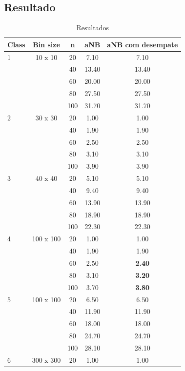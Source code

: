 \documentclass[article]{rian_article}
\begin{document}
\subsection{Resultado}
\begin{longtable}{|l|c|c|c|c|}
	\caption{Resultados}
	\label{tab:result} \\
	\hline
	\multicolumn{1}{|c|}{\textbf{Class}} & \multicolumn{1}{c|}{\textbf{Bin size}} & \multicolumn{1}{c|}{\textbf{n}} & \multicolumn{1}{c|}{\textbf{aNB \citep{resende2013}}} &  \multicolumn{1}{c|}{\textbf{aNB com desempate}}\\ \hline 
	\endfirsthead
	1 & 10 x 10 & 20 & 7.10 & 7.10 \\ \hline
	&  & 40 & 13.40 & 13.40 \\ \hline
	&  & 60 & 20.00 & 20.00 \\ \hline
	&  & 80 & 27.50 & 27.50 \\ \hline
	&  & 100 & 31.70 & 31.70 \\ \hline
	2 & 30 x 30 & 20 & 1.00 & 1.00 \\ \hline
	&  & 40 & 1.90 & 1.90 \\ \hline
	&  & 60 & 2.50 & 2.50 \\ \hline
	&  & 80 & 3.10 & 3.10 \\ \hline
	&  & 100 & 3.90 & 3.90 \\ \hline
	3 & 40 x 40 & 20 & 5.10 & 5.10 \\ \hline
	&  & 40 & 9.40 & 9.40 \\ \hline
	&  & 60 & 13.90 & 13.90 \\ \hline
	&  & 80 & 18.90 & 18.90 \\ \hline
	&  & 100 & 22.30 & 22.30 \\ \hline
	4 & 100 x 100 & 20 & 1.00 & 1.00 \\ \hline
	&  & 40 & 1.90 & 1.90 \\ \hline
	&  & 60 & 2.50 & \textbf{2.40} \\ \hline
	&  & 80 & 3.10 & \textbf{3.20} \\ \hline
	&  & 100 & 3.70 & \textbf{3.80} \\ \hline
	5 & 100 x 100 & 20 & 6.50 & 6.50 \\ \hline
	&  & 40 & 11.90 & 11.90 \\ \hline
	&  & 60 & 18.00 & 18.00 \\ \hline
	&  & 80 & 24.70 & 24.70 \\ \hline
	&  & 100 & 28.10 & 28.10 \\ \hline
	6 & 300 x 300 & 20 & 1.00 & 1.00 \\ \hline

\end{longtable}
\end{document}
